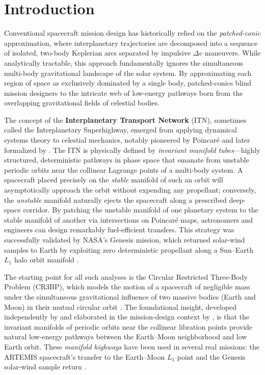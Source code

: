 \documentclass[12pt, a4paper]{article}
\begin{document}
\newpage
\section{Introduction}
\label{sec:intro}

Conventional spacecraft mission design has historically relied on the
\textit{patched-conic} approximation, where interplanetary trajectories are
decomposed into a sequence of isolated, two-body Keplerian arcs separated
by impulsive $\Delta v$ maneuvers.
While analytically tractable, this approach fundamentally ignores the
simultaneous multi-body gravitational landscape of the solar system.
By approximating each region of space as exclusively dominated by a single
body, patched-conics blind mission designers to the intricate web of
low-energy pathways born from the overlapping gravitational fields of
celestial bodies.

The concept of the \textbf{Interplanetary Transport Network} (ITN),
sometimes called the Interplanetary Superhighway, emerged from applying
dynamical systems theory to celestial mechanics, notably pioneered by
Poincaré and later formalized by \citet{Koon2000heteroclinic}.
The ITN is physically defined by \textit{invariant manifold tubes}---highly
structured, deterministic pathways in phase space that emanate from unstable
periodic orbits near the collinear Lagrange points of a multi-body system.
A spacecraft placed precisely on the \emph{stable} manifold of such an orbit
will asymptotically approach the orbit without expending any propellant;
conversely, the \emph{unstable} manifold naturally ejects the spacecraft
along a prescribed deep-space corridor.
By patching the unstable manifold of one planetary system to the stable
manifold of another via intersections on Poincaré maps, astronomers and
engineers can design remarkably fuel-efficient transfers.
This strategy was successfully validated by NASA's Genesis mission, which
returned solar-wind samples to Earth by exploiting zero deterministic
propellant along a Sun--Earth $L_1$ halo orbit manifold
\citep{Lo2001genesis}.

The starting point for all such analyses is the Circular Restricted
Three-Body Problem (CR3BP), which models the motion of a spacecraft of
negligible mass under the simultaneous gravitational influence of two massive
bodies (Earth and Moon) in their mutual circular orbit
\citep{Szebehely1967}.
The foundational insight, developed independently by
\citet{Conley1968} and elaborated in the mission-design context by
\citet{Belbruno1992}, is that the invariant manifolds of periodic orbits
near the collinear libration points provide natural low-energy pathways
between the Earth--Moon neighborhood and low Earth orbit.
These \emph{manifold highways} have been used in several real missions:
the ARTEMIS spacecraft's transfer to the Earth--Moon $L_1$ point
\citep{Broschart2014,Folta2012} and the Genesis solar-wind sample return
\citep{Lo2001genesis}.
\end{document}
